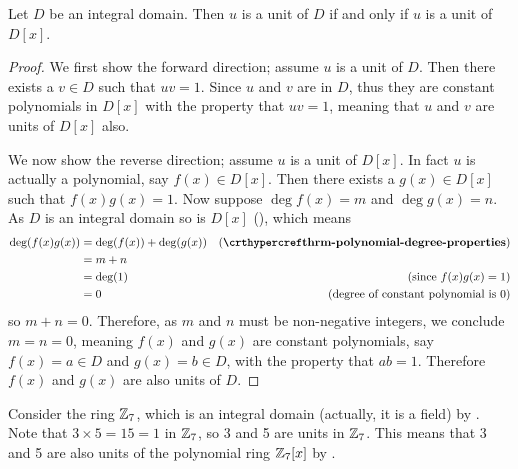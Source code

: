\begin{proposition}\label{prop-unit-of-ring-iff-unit-of-polynomial-ring}
    Let $D$ be an integral domain. Then $u$ is a unit of $D$ if and only if $u$ is a unit of $D[x]$.
\end{proposition}
\begin{proof}
    We first show the forward direction; assume $u$ is a unit of $D$. Then there exists a $v \in D$ such that $uv = 1$. Since $u$ and $v$ are in $D$, thus they are constant polynomials in $D[x]$ with the property that $uv = 1$, meaning that $u$ and $v$ are units of $D[x]$ also.

    We now show the reverse direction; assume $u$ is a unit of $D[x]$. In fact $u$ is actually a polynomial, say $f(x) \in D[x]$. Then there exists a $g(x) \in D[x]$ such that $f(x)g(x) = 1$. Now suppose $\deg f(x) = m$ and $\deg g(x) = n$. As $D$ is an integral domain so is $D[x]$ (), which means
    \begin{align*}
        \deg(f(x)g(x)) &= \deg(f(x)) + \deg(g(x)) & (\myref{thrm-polynomial-degree-properties})\\
        &= m + n\\
        &= \deg(1) & (\text{since }f(x)g(x) = 1)\\
        &= 0 & (\text{degree of constant polynomial is 0})
    \end{align*}
    so $m + n = 0$. Therefore, as $m$ and $n$ must be non-negative integers, we conclude $m = n = 0$, meaning $f(x)$ and $g(x)$ are constant polynomials, say $f(x) = a \in D$ and $g(x) = b \in D$, with the property that $ab = 1$. Therefore $f(x)$ and $g(x)$ are also units of $D$.
\end{proof}
\begin{example}
    Consider the ring $\mathbb{Z}_7$, which is an integral domain (actually, it is a field) by . Note that $3 \times 5 = 15 = 1$ in $\mathbb{Z}_7$, so 3 and 5 are units in $\mathbb{Z}_7$. This means that 3 and 5 are also units of the polynomial ring $\mathbb{Z}_7[x]$ by .
\end{example}

